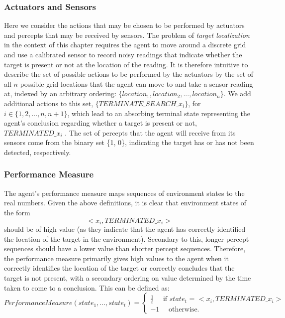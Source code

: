 \subsubsection{Actuators and Sensors}
Here we consider the actions that may be chosen to be performed by actuators and percepts that may be received by sensors. The problem of \textit{target localization} in the context of this chapter requires the agent to move around a discrete grid and use a calibrated sensor to record noisy readings that indicate whether the target is present or not at the location of the reading. It is therefore intuitive to describe the set of possible actions to be performed by the actuators by the set of all $n$ possible grid locations that the agent can move to and take a sensor reading at, indexed by an arbitrary ordering: $\{location_1, location_2, ..., location_n\}$. We add additional actions to this set, $\{TERMINATE\_SEARCH\_x_{i}\}$, for $i \in \{1, 2, ..., n, n+1\}$, which lead to an absorbing terminal state representing the agent's conclusion regarding whether a target is present or not, $TERMINATED\_x_{i}$ . The set of percepts that the agent will receive from its sensors come from the binary set \{1, 0\}, indicating the target has or has not been detected, respectively.



\subsubsection{Performance Measure}
The agent's performance measure maps sequences of environment states to the real numbers. Given the above definitions, it is clear that environment states of the form
\[ <x_i, TERMINATED\_x_i> \]
should be of high value (as they indicate that the agent has correctly identified the location of the target in the environment). Secondary to this, longer percept sequences should have a lower value than shorter percept sequences. Therefore, the performance measure primarily gives high values to the agent when it correctly identifies the location of the target or correctly concludes that the target is not present, with a secondary ordering on value determined by the time taken to come to a conclusion. This can be defined as:
\[
Performance Measure(state_1,..., state_t) = 
\begin{cases}
\frac{1}{t} \quad \text{ if } state_t \text{ = } <x_i, TERMINATED\_x_i>
\\
-1 \quad \text { otherwise. }
\end{cases}
\]

